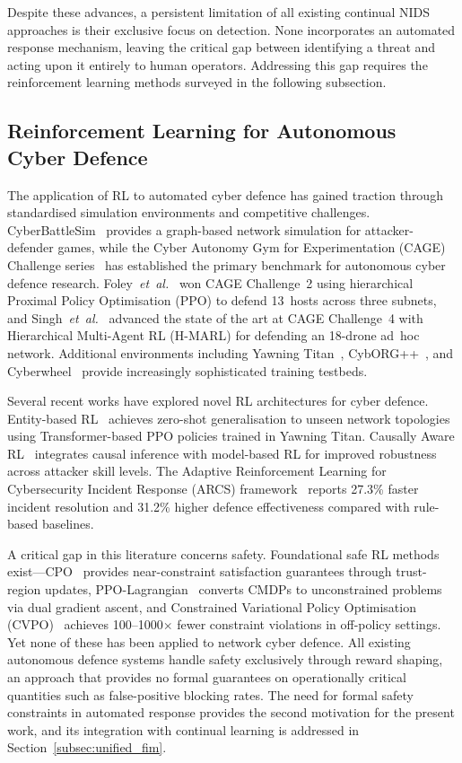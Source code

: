 \documentclass[journal]{IEEEtran}
\theoremstyle{definition}
\theoremstyle{remark}
\newcommand{\PPO}{\textsc{PPO}}
\begin{document}
Despite these advances, a persistent limitation of all existing continual NIDS approaches is their exclusive focus on detection. None incorporates an automated response mechanism, leaving the critical gap between identifying a threat and acting upon it entirely to human operators. Addressing this gap requires the reinforcement learning methods surveyed in the following subsection.

\subsection{Reinforcement Learning for Autonomous Cyber Defence}
\label{subsec:rl_related}

The application of RL to automated cyber defence has gained traction through standardised simulation environments and competitive challenges. CyberBattleSim~\cite{msdefender2021cyberbattlesim} provides a graph-based network simulation for attacker-defender games, while the Cyber Autonomy Gym for Experimentation (CAGE) Challenge series~\cite{cage2022,kiely2025cage4} has established the primary benchmark for autonomous cyber defence research. Foley~\textit{et~al.}~\cite{foley2022cage2} won CAGE Challenge~2 using hierarchical Proximal Policy Optimisation (\PPO{}) to defend 13~hosts across three subnets, and Singh~\textit{et~al.}~\cite{singh2025hmarl} advanced the state of the art at CAGE Challenge~4 with Hierarchical Multi-Agent RL (H-MARL) for defending an 18-drone ad~hoc network. Additional environments including Yawning Titan~\cite{andrew2022yawningtitan}, CybORG++~\cite{cyborgpp2024}, and Cyberwheel~\cite{cyberwheel2024} provide increasingly sophisticated training testbeds.

Several recent works have explored novel RL architectures for cyber defence. Entity-based RL~\cite{symes2024entity} achieves zero-shot generalisation to unseen network topologies using Transformer-based \PPO{} policies trained in Yawning Titan. Causally Aware RL~\cite{purves2024causal} integrates causal inference with model-based RL for improved robustness across attacker skill levels. The Adaptive Reinforcement Learning for Cybersecurity Incident Response (ARCS) framework~\cite{arcs2025} reports 27.3\% faster incident resolution and 31.2\% higher defence effectiveness compared with rule-based baselines.

A critical gap in this literature concerns safety. Foundational safe RL methods exist---CPO~\cite{achiam2017cpo} provides near-constraint satisfaction guarantees through trust-region updates, PPO-Lagrangian~\cite{ray2019ppolag} converts CMDPs to unconstrained problems via dual gradient ascent, and Constrained Variational Policy Optimisation (CVPO)~\cite{liu2022cvpo} achieves 100--1000$\times$ fewer constraint violations in off-policy settings. Yet none of these has been applied to network cyber defence. All existing autonomous defence systems handle safety exclusively through reward shaping, an approach that provides no formal guarantees on operationally critical quantities such as false-positive blocking rates. The need for formal safety constraints in automated response provides the second motivation for the present work, and its integration with continual learning is addressed in Section~\ref{subsec:unified_fim}.
\end{document}
